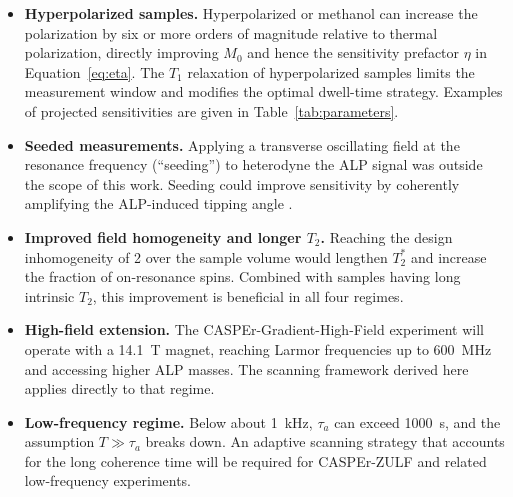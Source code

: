 \begin{itemize}
    \item \textbf{Hyperpolarized samples.} Hyperpolarized  or methanol can increase the polarization by six or more orders of magnitude relative to thermal polarization, directly improving $M_0$ and hence the sensitivity prefactor $\eta$ in Equation~\eqref{eq:eta}. The $T_1$ relaxation of hyperpolarized samples limits the measurement window and modifies the optimal dwell-time strategy. Examples of projected sensitivities are given in Table~\ref{tab:parameters}.

    \item \textbf{Seeded measurements.} Applying a transverse oscillating field at the resonance frequency (``seeding'') to heterodyne the ALP signal was outside the scope of this work. Seeding could improve sensitivity by coherently amplifying the ALP-induced tipping angle \cite{Aybas_2021_Quantum_sensitivity}.

    \item \textbf{Improved field homogeneity and longer $T_2$.} Reaching the design inhomogeneity of \SI{2}{\ppm} over the sample volume would lengthen $T_2^*$ and increase the fraction of on-resonance spins. Combined with samples having long intrinsic $T_2$, this improvement is beneficial in all four regimes.

    \item \textbf{High-field extension.} The CASPEr-Gradient-High-Field experiment will operate with a \SI{14.1}{\tesla} magnet, reaching Larmor frequencies up to \SI{600}{\MHz} and accessing higher ALP masses. The scanning framework derived here applies directly to that regime.

    \item \textbf{Low-frequency regime.} Below about \SI{1}{\kHz}, $\tau_a$ can exceed \SI{1000}{\second}, and the assumption $T \gg \tau_a$ breaks down. An adaptive scanning strategy that accounts for the long coherence time will be required for CASPEr-ZULF \cite{CASPEr_ZULF_2019} and related low-frequency experiments.
\end{itemize}

